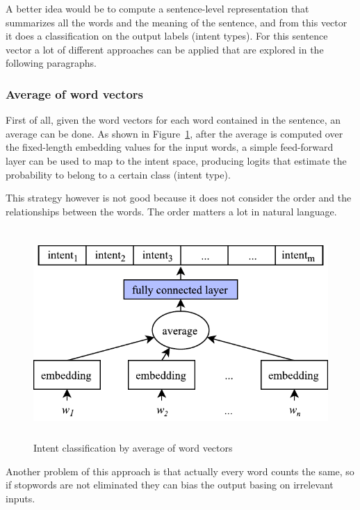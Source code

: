 A better idea would be to compute a sentence-level representation that summarizes all the words and the meaning of the sentence, and from this vector it does a classification on the output labels (intent types). For this sentence vector a lot of different approaches can be applied that are explored in the following paragraphs.

\subsubsection{Average of word vectors}
First of all, given the word vectors for each word contained in the sentence, an average can be done. As shown in Figure~\ref{fig:intentAverage}, after the average is computed over the fixed-length embedding values for the input words, a simple feed-forward layer can be used to map to the intent space, producing logits that estimate the probability to belong to a certain class (intent type).

This strategy however is not good because it does not consider the order and the relationships between the words. The order matters a lot in natural language.

\begin{figure}[!htbp]
    \centering
    \includegraphics[max width=\linewidth,max height=8cm,keepaspectratio]{figures/intentAverage}
    \caption{Intent classification by average of word vectors}\label{fig:intentAverage}
\end{figure}

Another problem of this approach is that actually every word counts the same, so if stopwords are not eliminated they can bias the output basing on irrelevant inputs.


